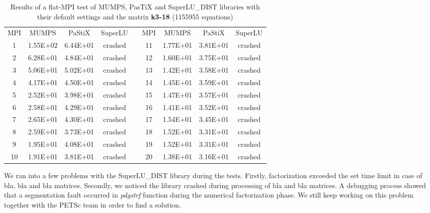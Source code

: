 \begin{table}[h!]
\centering
\begin{tabular}{|c|c|c|c|l|c|c|c|c|}
\cline{1-4} \cline{6-9}
MPI & MUMPS    & PaStiX   & SuperLU &  & MPI & MUMPS    & PaStiX   & SuperLU \\ \cline{1-4} \cline{6-9} 
1   & 1.55E+02 & 6.44E+01 & crashed &  & 11  & 1.77E+01 & 3.81E+01 & crashed \\ \cline{1-4} \cline{6-9} 
2   & 6.28E+01 & 4.84E+01 & crashed &  & 12  & 1.60E+01 & 3.75E+01 & crashed \\ \cline{1-4} \cline{6-9} 
3   & 5.06E+01 & 5.02E+01 & crashed &  & 13  & 1.42E+01 & 3.58E+01 & crashed \\ \cline{1-4} \cline{6-9} 
4   & 4.17E+01 & 4.50E+01 & crashed &  & 14  & 1.45E+01 & 3.59E+01 & crashed \\ \cline{1-4} \cline{6-9} 
5   & 2.52E+01 & 3.98E+01 & crashed &  & 15  & 1.47E+01 & 3.57E+01 & crashed \\ \cline{1-4} \cline{6-9} 
6   & 2.58E+01 & 4.29E+01 & crashed &  & 16  & 1.41E+01 & 3.52E+01 & crashed \\ \cline{1-4} \cline{6-9} 
7   & 2.65E+01 & 4.30E+01 & crashed &  & 17  & 1.54E+01 & 3.45E+01 & crashed \\ \cline{1-4} \cline{6-9} 
8   & 2.59E+01 & 3.73E+01 & crashed &  & 18  & 1.52E+01 & 3.31E+01 & crashed \\ \cline{1-4} \cline{6-9} 
9   & 1.95E+01 & 4.08E+01 & crashed &  & 19  & 1.52E+01 & 3.31E+01 & crashed \\ \cline{1-4} \cline{6-9} 
10  & 1.91E+01 & 3.81E+01 & crashed &  & 20  & 1.38E+01 & 3.16E+01 & crashed \\ \cline{1-4} \cline{6-9} 
\end{tabular}
\caption{Results of a flat-MPI test of MUMPS, PasTiX and SuperLU\_DIST libraries with their default settings and the matrix \textbf{k3-18} (1155955 equations)}
\label{table:lc-k3-18-result}
\end{table}





We ran into a few problems with the SuperLU\_DIST library during the tests. Firstly, factorization exceeded the set time limit in case of bla, bla and bla matrices. Secondly, we noticed the library crashed during processing of bla and bla matrices. A debugging process showed that a segmentation fault occurred in \textit{pdgstrf} function during the numerical factorization phase. We still keep working on this problem together with the PETSc team in order to find a solution. \\

